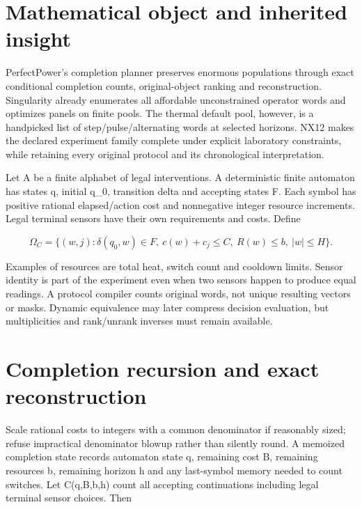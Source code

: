 \documentclass[
  11pt,
  a4paper,
]{report}
\begin{document}
\hypertarget{mathematical-object-and-inherited-insight}{%
\section{Mathematical object and inherited
insight}\label{mathematical-object-and-inherited-insight}}

PerfectPower's completion planner preserves enormous populations through
exact conditional completion counts, original-object ranking and
reconstruction. Singularity already enumerates all affordable
unconstrained operator words and optimizes panels on finite pools. The
thermal default pool, however, is a handpicked list of
step/pulse/alternating words at selected horizons. NX12 makes the
declared experiment family complete under explicit laboratory
constraints, while retaining every original protocol and its
chronological interpretation.

Let A be a finite alphabet of legal interventions. A deterministic
finite automaton has states q, initial q\_0, transition delta and
accepting states F. Each symbol has positive rational elapsed/action
cost and nonnegative integer resource increments. Legal terminal sensors
have their own requirements and costs. Define

\[
\Omega_C=\{(w,j):\delta(q_0,w)\in F,\ c(w)+c_j\le C,\ R(w)\le b,\ |w|\le H\}.
\]

Examples of resources are total heat, switch count and cooldown limits.
Sensor identity is part of the experiment even when two sensors happen
to produce equal readings. A protocol compiler counts original words,
not unique resulting vectors or masks. Dynamic equivalence may later
compress decision evaluation, but multiplicities and rank/unrank
inverses must remain available.

\hypertarget{completion-recursion-and-exact-reconstruction}{%
\section{Completion recursion and exact
reconstruction}\label{completion-recursion-and-exact-reconstruction}}

Scale rational costs to integers with a common denominator if reasonably
sized; refuse impractical denominator blowup rather than silently round.
A memoized completion state records automaton state q, remaining cost B,
remaining resources b, remaining horizon h and any last-symbol memory
needed to count switches. Let C(q,B,b,h) count all accepting
continuations including legal terminal sensor choices. Then
\end{document}
